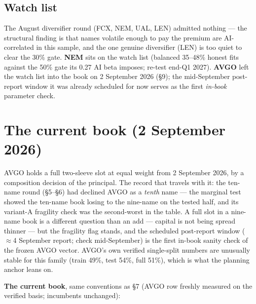 \documentclass[11pt,a4paper]{article}
\begin{document}
\subsection{Watch list}

The August diversifier round (FCX, NEM, UAL, LEN) admitted nothing --- the
structural finding is that names volatile enough to pay the premium are
AI-correlated in this sample, and the one genuine diversifier (LEN) is too
quiet to clear the 30\% gate. \textbf{NEM} sits on the watch list (balanced
35--48\% honest fits against the 50\% gate its 0.27 AI beta imposes; re-test
end-Q1 2027). \textbf{AVGO} left the watch list into the book on 2 September
2026 (\S9); the mid-September post-report window it was already scheduled for
now serves as the first \emph{in-book} parameter check.

\section{The current book (2 September 2026)}

AVGO holds a full two-sleeve slot at equal weight from 2 September 2026, by
a composition decision of the principal. The record that travels with it: the
ten-name round (\S5--\S6) had declined AVGO as a \emph{tenth} name --- the
marginal test showed the ten-name book losing to the nine-name on the tested
half, and its variant-A fragility check was the second-worst in the table. A
full slot in a nine-name book is a different question than an add --- capital
is not being spread thinner --- but the fragility flag stands, and the
scheduled post-report window ($\approx$4 September report; check
mid-September) is the first in-book sanity check of the frozen AVGO vector.
AVGO's own verified single-split numbers are unusually stable for this family
(train 49\%, test 54\%, full 51\%), which is what the planning anchor leans
on.

\textbf{The current book}, same conventions as \S7 (AVGO row freshly
measured on the verified basis; incumbents unchanged):
\end{document}
